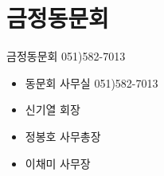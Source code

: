 \documentclass[aspectratio=1610,20pt,xcolor=pdftex,dvipsnames,table,handout]{beamer}
\begin{document}
		\section{금정동문회}
		\begin{frame} [t,plain]


			\begin{block} {금정동문회 051)582-7013}
			\setlength{\leftmargini}{1em}			
			\begin{itemize}
				\item 동문회 사무실 051)582-7013
				\item 신기열 회장	\hrulefill
				\item 정봉호 사무총장 	\hrulefill
				\item 이채미 사무장 	\hrulefill

			\end{itemize}
			\end{block}						
		\end{frame}					


\end{document}
